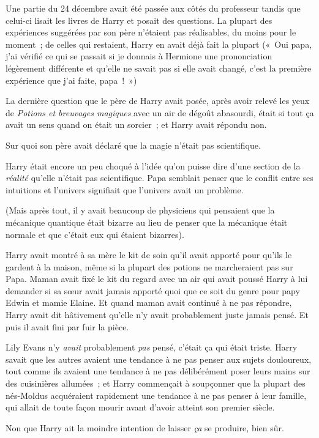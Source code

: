 Une partie du 24 décembre avait été passée aux côtés du professeur tandis que celui-ci lisait les livres de Harry et posait des questions. La plupart des expériences suggérées par son père n'étaient pas réalisables, du moins pour le moment~; de celles qui restaient, Harry en avait déjà fait la plupart («~Oui papa, j'ai vérifié ce qui se passait si je donnais à Hermione une prononciation légèrement différente et qu'elle ne savait pas si elle avait changé, c'est la première expérience que j'ai faite, papa~!~»)

La dernière question que le père de Harry avait posée, après avoir relevé les yeux de \emph{Potions et breuvages magiques} avec un air de dégoût abasourdi, était si tout ça avait un sens quand on était un sorcier~; et Harry avait répondu non.

Sur quoi son père avait déclaré que la magie n'était pas scientifique.

Harry était encore un peu choqué à l'idée qu'on puisse dire d'une section de la \emph{réalité} qu'elle n'était pas scientifique. Papa semblait penser que le conflit entre ses intuitions et l'univers signifiait que l'univers avait un problème.

(Mais après tout, il y avait beaucoup de physiciens qui pensaient que la mécanique quantique était bizarre au lieu de penser que la mécanique était normale et que c'était eux qui étaient bizarres).

Harry avait montré à sa mère le kit de soin qu'il avait apporté pour qu'ils le gardent à la maison, même si la plupart des potions ne marcheraient pas sur Papa. Maman avait fixé le kit du regard avec un air qui avait poussé Harry à lui demander si sa sœur avait jamais apporté quoi que ce soit du genre pour papy Edwin et mamie Elaine. Et quand maman avait continué à ne pas répondre, Harry avait dit hâtivement qu'elle n'y avait probablement juste jamais pensé. Et puis il avait fini par fuir la pièce.

Lily Evans n'y \emph{avait} probablement \emph{pas} pensé, c'était ça qui était triste. Harry savait que les autres avaient une tendance à ne pas penser aux sujets douloureux, tout comme ils avaient une tendance à ne pas délibérément poser leurs mains sur des cuisinières allumées~; et Harry commençait à soupçonner que la plupart des nés-Moldus acquéraient rapidement une tendance à ne pas penser à leur famille, qui allait de toute façon mourir avant d'avoir atteint son premier siècle.

Non que Harry ait la moindre intention de laisser \emph{ça} se produire, bien sûr.

